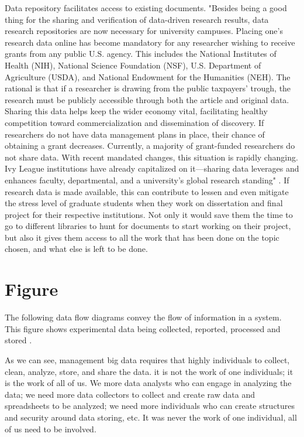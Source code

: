 \documentclass[sigconf]{acmart}
\begin{document}
Data repository facilitates access to existing documents. "Besides being a good thing for the sharing and verification of data-driven research results, data research repositories are now necessary for university campuses. Placing one’s research data online has become mandatory for any researcher wishing to receive grants from any public U.S. agency. This includes the National Institutes of Health (NIH), National Science Foundation (NSF), U.S. Department of Agriculture (USDA), and National Endowment for the Humanities (NEH). The rational is that if a researcher is drawing from the public taxpayers’ trough, the research must be publicly accessible through both the article and original data. Sharing this data helps keep the wider economy vital, facilitating healthy competition toward commercialization and dissemination of discovery. If researchers do not have data management plans in place, their chance of obtaining a grant decreases. Currently, a majority of grant-funded researchers do not share data. With recent mandated changes, this situation is rapidly changing. Ivy League institutions have already capitalized on it—sharing data leverages and enhances faculty, departmental, and a university’s global research standing" \cite{Uswyshyn2016}. If research data is made available, this can contribute to lessen and even mitigate the stress level of graduate students when they work on dissertation and final project for their respective institutions. Not only it would save them the time to go to different libraries to hunt for documents to start working on their project, but also it gives them access to all the work that has been done on the topic chosen, and what else is left to be done.  


\section{Figure}

The following data flow diagrams convey the flow of information in a system. This  figure shows experimental data being collected, reported, processed and stored \cite{fokkema2012}. 

As we can see, management big data requires that highly individuals to collect, clean, analyze, store, and share the data. it is not the work of one individuals; it is the work of all of us. We more data analysts who can engage in analyzing the data; we need more data collectors to collect and create raw data and spreadsheets to be analyzed; we need more individuals who can create structures and security around data storing, etc. It was never the work of one individual, all of us need to be involved. 
\end{document}
